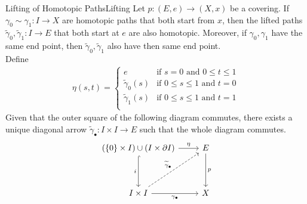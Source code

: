 \documentclass{report}
\begin{document}
\begin{proposition}{Lifting of Homotopic Paths}{Lifting}
	\label{my_proposition}
	Let $p: (E,e) \to (X,x)$ be a covering. If $\gamma_0 \sim \gamma_1: I \to X$ are homotopic paths that both start from $x$, then the lifted paths $\widetilde{\gamma}_0, \widetilde{\gamma}_1: I \to E$ that both start at $e$ are also homotopic. Moreover, if $\gamma_0,\gamma_1$ have the same end point, then $\widetilde{\gamma}_0, \widetilde{\gamma}_1$ also have then same end point.\\
	Define
	\begin{align*}
		\eta(s,t)=\begin{cases}
			          e                       & \text{if }s=0\text{ and }0\le t\le 1  \\
			          \widetilde{\gamma}_0(s) & \text{if }0\le s\le 1 \text{ and }t=0 \\
			          \widetilde{\gamma}_1(s) & \text{if }0\le s\le 1 \text{ and }t=1 \\
		          \end{cases}
	\end{align*}
	Given that the outer square of the following diagram commutes, there exists a unique diagonal arrow $\widetilde{\gamma}_\bullet:I\times I\to E$ such that the whole diagram commutes.
	\[
		\begin{tikzcd}[ampersand replacement=\&]
			(\{0\}\times I )\cup (I\times\partial I ) \arrow[r, "\eta"] \arrow[d, "i"', hook]                      \& E \arrow[d, "p"] \\ [+20pt]
			I \times I \arrow[r, "\gamma_\bullet"'] \arrow[ru, "\widetilde{\gamma}_\bullet", dashed] \& X
		\end{tikzcd}
	\]
\end{proposition}
\end{document}
